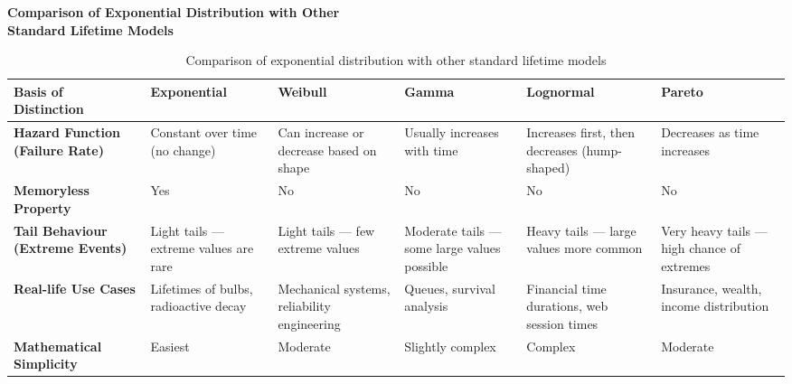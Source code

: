 \documentclass[12pt, a4paper, onecolumn, answers]{exam}
\begin{document}
\newpage

\begin{center}
    \large \textbf{Comparison of Exponential Distribution with Other\\ Standard Lifetime Models}
\end{center}

\begin{table}[h!]
\def\arraystretch{1.5}
\centering
\begin{tabularx}{\textwidth}{>{\raggedright\arraybackslash}p{3.5cm} 
                              >{\raggedright\arraybackslash}p{2.5cm} 
                              >{\raggedright\arraybackslash}p{2.5cm}
                              >{\raggedright\arraybackslash}p{2.5cm} 
                              >{\raggedright\arraybackslash}p{2.5cm} 
                              >{\raggedright\arraybackslash}p{2.5cm}}
\toprule
\textbf{Basis of Distinction} & \textbf{Exponential} & \textbf{Weibull} & \textbf{Gamma} & \textbf{Lognormal} & \textbf{Pareto} \\
\midrule

\textbf{Hazard Function (Failure Rate)} 
& Constant over time (no change) 
& Can increase or decrease based on shape 
& Usually increases with time 
& Increases first, then decreases (hump-shaped) 
& Decreases as time increases \\

\textbf{Memoryless Property} 
& Yes
& No
& No
& No
& No \\

\textbf{Tail Behaviour (Extreme Events)} 
& Light tails — extreme values are rare 
& Light tails — few extreme values 
& Moderate tails — some large values possible 
& Heavy tails — large values more common 
& Very heavy tails — high chance of extremes \\

\textbf{Real-life Use Cases} 
& Lifetimes of bulbs, radioactive decay 
& Mechanical systems, reliability engineering 
& Queues, survival analysis 
& Financial time durations, web session times 
& Insurance, wealth, income distribution \\

\textbf{Mathematical Simplicity} 
& Easiest
& Moderate
& Slightly complex
& Complex
& Moderate \\

\bottomrule
\end{tabularx}
\caption{Comparison of exponential distribution with other standard lifetime models}
\end{table}
\end{document}
